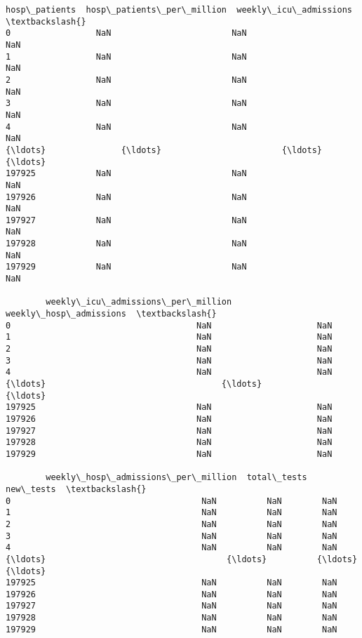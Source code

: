 \documentclass[11pt]{article}
\begin{document}
\begin{tcolorbox}[breakable, size=fbox, boxrule=.5pt, pad at break*=1mm, opacityfill=0]
\begin{Verbatim}[commandchars=\\\{\}]
        hosp\_patients  hosp\_patients\_per\_million  weekly\_icu\_admissions  \textbackslash{}
0                 NaN                        NaN                    NaN
1                 NaN                        NaN                    NaN
2                 NaN                        NaN                    NaN
3                 NaN                        NaN                    NaN
4                 NaN                        NaN                    NaN
{\ldots}               {\ldots}                        {\ldots}                    {\ldots}
197925            NaN                        NaN                    NaN
197926            NaN                        NaN                    NaN
197927            NaN                        NaN                    NaN
197928            NaN                        NaN                    NaN
197929            NaN                        NaN                    NaN

        weekly\_icu\_admissions\_per\_million  weekly\_hosp\_admissions  \textbackslash{}
0                                     NaN                     NaN
1                                     NaN                     NaN
2                                     NaN                     NaN
3                                     NaN                     NaN
4                                     NaN                     NaN
{\ldots}                                   {\ldots}                     {\ldots}
197925                                NaN                     NaN
197926                                NaN                     NaN
197927                                NaN                     NaN
197928                                NaN                     NaN
197929                                NaN                     NaN

        weekly\_hosp\_admissions\_per\_million  total\_tests  new\_tests  \textbackslash{}
0                                      NaN          NaN        NaN
1                                      NaN          NaN        NaN
2                                      NaN          NaN        NaN
3                                      NaN          NaN        NaN
4                                      NaN          NaN        NaN
{\ldots}                                    {\ldots}          {\ldots}        {\ldots}
197925                                 NaN          NaN        NaN
197926                                 NaN          NaN        NaN
197927                                 NaN          NaN        NaN
197928                                 NaN          NaN        NaN
197929                                 NaN          NaN        NaN


\end{Verbatim}
\end{tcolorbox}
\end{document}
